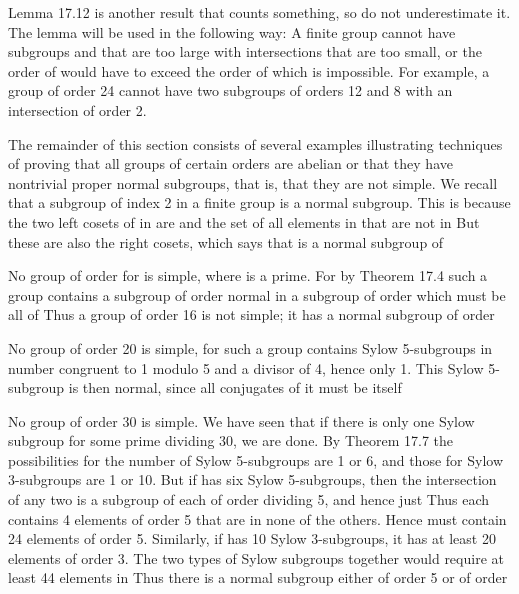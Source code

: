 \documentclass[11pt,oneside]{article}
\begin{document}
\begin{BookBody}

Lemma 17.12 is another result that counts something, so do not underestimate it. The lemma will be used in the following way: A finite group  cannot have subgroups  and  that are too large with intersections that are too small, or the order of  would have to exceed the order of  which is impossible. For example, a group of order 24 cannot have two subgroups of orders 12 and 8 with an intersection of order 2.

The remainder of this section consists of several examples illustrating techniques of proving that all groups of certain orders are abelian or that they have nontrivial proper normal subgroups, that is, that they are not simple. We recall that a subgroup  of index 2 in a finite group  is a normal subgroup. This is because the two left cosets of  in  are  and the set of all elements in  that are not in  But these are also the right cosets, which says that  is a normal subgroup of 

 No group of order  for  is simple, where  is a prime. For by Theorem 17.4 such a group  contains a subgroup of order  normal in a subgroup of order  which must be all of  Thus a group of order 16 is not simple; it has a normal subgroup of order \BookEnd{\blacktriangle}

 No group of order 20 is simple, for such a group  contains Sylow 5-subgroups in number congruent to 1 modulo 5 and a divisor of 4, hence only 1. This Sylow 5-subgroup is then normal, since all conjugates of it must be itself\BookEnd{\blacktriangle}

 No group of order 30 is simple. We have seen that if there is only one Sylow subgroup for some prime  dividing 30, we are done. By Theorem 17.7 the possibilities for the number of Sylow 5-subgroups are 1 or 6, and those for Sylow 3-subgroups are 1 or 10. But if  has six Sylow 5-subgroups, then the intersection of any two is a subgroup of each of order dividing 5, and hence just  Thus each contains 4 elements of order 5 that are in none of the others. Hence  must contain 24 elements of order 5. Similarly, if  has 10 Sylow 3-subgroups, it has at least 20 elements of order 3. The two types of Sylow subgroups together would require at least 44 elements in  Thus there is a normal subgroup either of order 5 or of order \BookEnd{\blacktriangle}


\end{BookBody}
\end{document}
